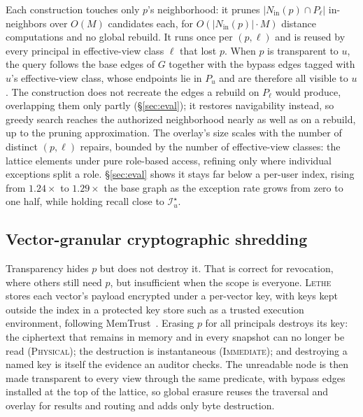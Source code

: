 \documentclass[sigconf, nonacm, review]{acmart}
\newcommand{\Nin}{N_{\mathrm{in}}}
\begin{document}
\begin{sloppypar}
Each construction touches only $p$'s neighborhood: it prunes
$|\Nin(p)\cap P_\ell|$ in-neighbors over $O(M)$ candidates each, for
$O(|\Nin(p)|\cdot M)$ distance computations and no global rebuild. It runs
once per $(p,\ell)$ and is reused by every principal in effective-view
class $\ell$ that lost $p$. When $p$ is transparent to $u$, the query follows the base edges
of $G$ together with the bypass edges tagged with $u$'s effective-view
class, whose endpoints lie in $P_u$ and are therefore all visible to $u$. The construction does not recreate the edges a rebuild on $P_\ell$ would
produce, overlapping them only partly (\S\ref{sec:eval}); it restores
navigability instead, so greedy search reaches the authorized neighborhood
nearly as well as on a rebuild, up to the pruning approximation. The overlay's size scales with the number of
distinct $(p,\ell)$ repairs, bounded by the number of effective-view classes:
the lattice elements under pure role-based access, refining only where
individual exceptions split a role. \S\ref{sec:eval} shows it stays far
below a per-user index, rising from $1.24\times$ to $1.29\times$ the base
graph as the exception rate grows from zero to one half, while holding recall
close to $\mathcal{I}^\star_u$.
\end{sloppypar}

\subsection{Vector-granular cryptographic shredding}

Transparency hides $p$ but does not destroy it. That is correct for
revocation, where others still need $p$, but insufficient when the scope is
everyone. \textsc{Lethe} stores each vector's payload encrypted under a per-vector
key, with keys kept outside the index in a protected key store such as a
trusted execution environment, following
MemTrust~\cite{DBLP:journals/corr/abs-2601-07004}. Erasing $p$ for all
principals destroys its key: the ciphertext that remains in memory and in
every snapshot can no longer be read (\textsc{Physical}); the destruction is
instantaneous (\textsc{Immediate}); and destroying a named key is itself the
evidence an auditor checks. The unreadable node is then made transparent to
every view through the same predicate, with bypass edges installed at the
top of the lattice, so global erasure reuses the traversal and overlay for
results and routing and adds only byte destruction.
\end{document}
